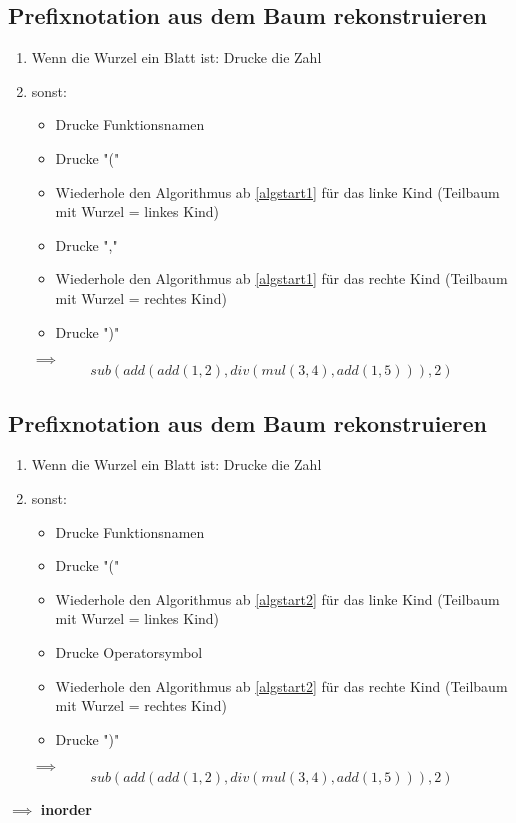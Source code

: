 \documentclass[a4paper]{scrartcl}
\theoremstyle{definition}
\theoremstyle{plain}
\theoremstyle{remark}
\theoremstyle{remark}
\begin{document}
\subsection{Prefixnotation aus dem Baum rekonstruieren}
\label{sec-4-4}
\begin{enumerate}
\item \label{algstart1} Wenn die Wurzel ein Blatt ist: Drucke die Zahl
\item sonst:
\begin{itemize}
\item Drucke Funktionsnamen
\item Drucke "("
\item Wiederhole den Algorithmus ab \ref{algstart1} für das linke Kind (Teilbaum mit Wurzel = linkes Kind)
\item Drucke ","
\item Wiederhole den Algorithmus ab \ref{algstart1} für das rechte Kind (Teilbaum mit Wurzel = rechtes Kind)
\item Drucke ")"
\end{itemize}
$\implies$ \[sub(add(add(1,2),div(mul(3,4),add(1,5))), 2)\]
\end{enumerate}
\subsection{Prefixnotation aus dem Baum rekonstruieren}
\label{sec-4-5}
\begin{enumerate}
\item \label{algstart2} Wenn die Wurzel ein Blatt ist: Drucke die Zahl
\item sonst:
\begin{itemize}
\item Drucke Funktionsnamen
\item Drucke "("
\item Wiederhole den Algorithmus ab \ref{algstart2} für das linke Kind (Teilbaum mit Wurzel = linkes Kind)
\item Drucke Operatorsymbol
\item Wiederhole den Algorithmus ab \ref{algstart2} für das rechte Kind (Teilbaum mit Wurzel = rechtes Kind)
\item Drucke ")"
\end{itemize}
$\implies$ \[sub(add(add(1,2),div(mul(3,4),add(1,5))), 2)\]
\end{enumerate}
$\implies$ \textbf{inorder}
\end{document}
